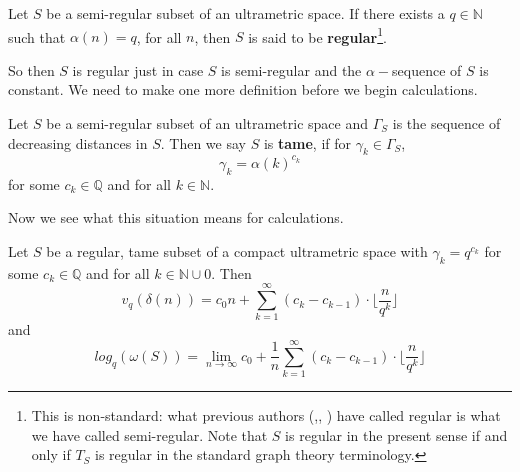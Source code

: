 \begin{definition}
Let $S$ be a semi-regular subset of an ultrametric space. If there exists a $q \in \mathbb{N}$ such that $\alpha(n) = q$, for all $n$, then $S$ is said to be \textbf{regular}\footnote{This is non-standard: what previous authors (\cite{amice},\cite{cef}, \cite{fp}) have called regular is what we have called semi-regular. Note that $S$ is regular in the present sense if and only if $T_S$ is regular in the standard graph theory terminology.}. %
\end{definition}


So then $S$ is regular just in case $S$ is semi-regular and the $\alpha-$sequence of $S$ is constant. We need to make one more definition before we begin calculations. \\

\begin{definition}
Let $S$ be a semi-regular subset of an ultrametric space and $\Gamma_S$ is the sequence of decreasing distances in $S$. Then we say $S$ is \textbf{tame}, if for $\gamma_k \in \Gamma_S$, \[\gamma_k = \alpha(k)^{c_k}\] for some $c_k \in \mathbb{Q}$ and for all $k \in \mathbb{N}$.
\end{definition}

Now we see what this situation means for calculations.\\

\begin{proposition}
	Let $S$ be a regular, tame subset of a compact ultrametric space with $\gamma_k = q^{c_k}$ for some $c_k \in \mathbb{Q}$ and for all $k \in \mathbb{N} \cup 0$. Then 
	\[v_{q}(\delta(n)) =  c_0n + \sum_{k=1}^{\infty} (c_{k} - c_{k-1}) \cdot \lfloor\frac{n}{q^{k}}\rfloor \]
	 and 
	\[log_q(\omega(S)) = \lim_{n\to\infty} c_0 + \frac{1}{n}\sum_{k=1}^{\infty} (c_{k} - c_{k-1}) \cdot \lfloor\frac{n}{q^{k}}\rfloor  \]
\end{proposition}

